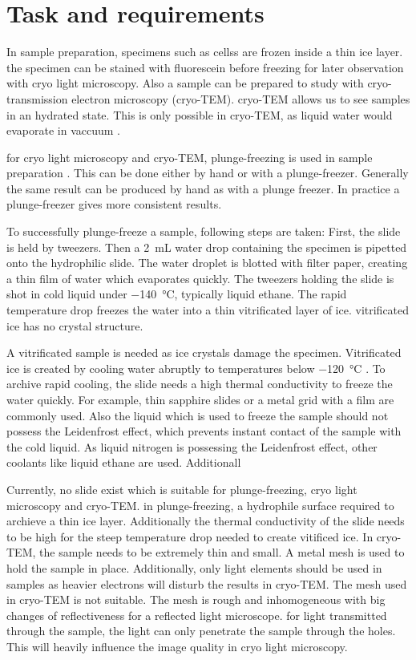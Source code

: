 \section{Task and requirements}

In sample preparation, specimens such as cellss are frozen inside a thin ice layer. the specimen can be stained with fluorescein before freezing for later observation with cryo light microscopy. Also a sample can be prepared to study with cryo-transmission electron microscopy (cryo-TEM). cryo-TEM allows us to see samples in an hydrated state. This is only possible in cryo-TEM, as liquid water would evaporate in vaccuum \cite{Danino.2012}.

for cryo light microscopy and cryo-TEM, plunge-freezing is used in sample preparation \cite{Danino.2012} \cite{Faoro.2018}. This can be done either by hand or with a plunge-freezer. Generally the same result can be produced by hand as with a plunge freezer. In practice a plunge-freezer gives more consistent results.

To successfully plunge-freeze a sample, following steps are taken: First, the slide is held by tweezers. Then a \SI{2}{\milli\liter} water drop containing the specimen is pipetted onto the hydrophilic slide. The water droplet is blotted with filter paper, creating a thin film of water which evaporates quickly. The tweezers holding the slide is shot in cold liquid under \SI{-140}{\degreeCelsius}, typically liquid ethane. The rapid temperature drop freezes the water into a thin vitrificated layer of ice. vitrificated ice has no crystal structure.

A vitrificated sample is needed as ice crystals damage the specimen. Vitrificated ice is created by cooling water abruptly to temperatures below \SI{-120}{\degreeCelsius} \cite{Wowk.2010}. To archive rapid cooling, the slide needs a high thermal conductivity to freeze the water quickly. For example, thin sapphire slides or a metal grid with a film are commonly used. Also the liquid which is used to freeze the sample should not possess the Leidenfrost effect, which prevents instant contact of the sample with the cold liquid. As liquid nitrogen is possessing the Leidenfrost effect, other coolants like liquid ethane are used. Additionall

Currently, no slide exist which is suitable for plunge-freezing, cryo light microscopy and cryo-TEM. in plunge-freezing, a hydrophile surface required to archieve a thin ice layer. Additionally the thermal conductivity of the slide needs to be high for the steep temperature drop needed to create vitificed ice. In cryo-TEM, the sample needs to be extremely thin and small. A metal mesh is used to hold the sample in place. Additionally, only light elements should be used in samples as heavier electrons will disturb the results in cryo-TEM. The mesh used in cryo-TEM is not suitable. The mesh is rough and inhomogeneous with big changes of reflectiveness for a reflected light microscope. for light transmitted through the sample, the light can only penetrate the sample through the holes. This will heavily influence the image quality in cryo light microscopy.
 
